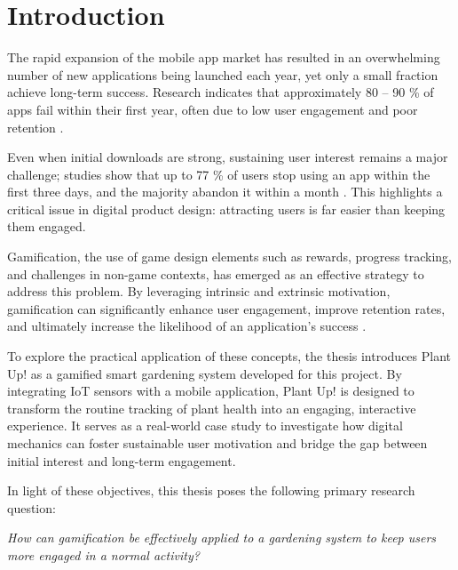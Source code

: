 \section{Introduction}

The rapid expansion of the mobile app market has resulted in an overwhelming number of new applications being launched each year, yet only a small fraction achieve long-term success. 
Research indicates that approximately 80 -- 90 \% of apps fail within their first year, often due to low user engagement and poor retention \cite{businessOfAppsRetention, ethoraRetention}. 

Even when initial downloads are strong, sustaining user interest remains a major challenge; studies show that up to 77 \% of users stop using an app within the first three days, and the majority abandon it within a month \cite{localyticsRetention}. This highlights a critical issue in digital product design: attracting users is far easier than keeping them engaged. 

Gamification, the use of game design elements such as rewards, progress tracking, and challenges in non-game contexts, has emerged as an effective strategy to address this problem. By leveraging intrinsic and extrinsic motivation, gamification can significantly enhance user engagement, improve retention rates, and ultimately increase the likelihood of an application's success \cite{barariGamification2024}.

To explore the practical application of these concepts, the thesis introduces Plant Up! \cite{plantUpProject} as a gamified smart gardening system developed for this project. By integrating IoT sensors with a mobile application, Plant Up! is designed to transform the routine tracking of plant health into an engaging, interactive experience. It serves as a real-world case study to investigate how digital mechanics can foster sustainable user motivation and bridge the gap between initial interest and long-term engagement.

In light of these objectives, this thesis poses the following primary research question:

\vspace{0.5em}
\noindent
\textit{How can gamification be effectively applied to a gardening system to keep users more engaged in a normal activity?}
\nocite{diplomarbeitSelfDennis}
